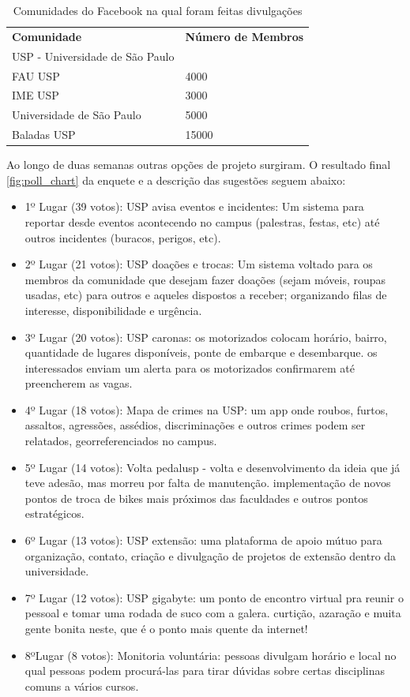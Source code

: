 \begin{table}[]
\centering
\caption{Comunidades do Facebook na qual foram feitas divulgações}
\label{my-label}
\begin{tabular}{ll}
{\color[HTML]{3531FF} \textbf{Comunidade}} & {\color[HTML]{3531FF} \textbf{Número de Membros}} \\
USP - Universidade de São Paulo            &                                                   \\
FAU USP                                    & 4000                                              \\
IME USP                                    & 3000                                              \\
Universidade de São Paulo                  & 5000                                              \\
Baladas USP                                & 15000
\end{tabular}
\end{table}
\par Ao longo de duas semanas outras opções de projeto surgiram. O resultado final \ref{fig:poll_chart} da enquete e a descrição das sugestões seguem abaixo:
\begin{itemize}
\item{ 1º Lugar (39 votos):} USP avisa eventos e incidentes: Um sistema para reportar desde eventos acontecendo no campus (palestras, festas, etc) até outros incidentes (buracos, perigos, etc).
\item {2º Lugar (21 votos):} USP doações e trocas: Um sistema voltado para os membros da comunidade que desejam fazer doações (sejam móveis, roupas usadas, etc) para outros e aqueles dispostos a receber; organizando filas de interesse, disponibilidade e urgência.
\item {3º Lugar (20 votos):} USP caronas: os motorizados colocam horário, bairro, quantidade de lugares disponíveis, ponte de embarque e desembarque. os interessados enviam um alerta para os motorizados confirmarem até preencherem as vagas.
\item {4º Lugar (18 votos):} Mapa de crimes na USP: um app onde roubos, furtos, assaltos, agressões, assédios, discriminações e outros crimes podem ser relatados, georreferenciados no campus.
\item {5º Lugar (14 votos):} Volta pedalusp - volta e desenvolvimento da ideia que já teve adesão, mas morreu por falta de manutenção. implementação de novos pontos de troca de bikes mais próximos das faculdades e outros pontos estratégicos.
\item {6º Lugar (13 votos): } USP extensão: uma plataforma de apoio mútuo para organização, contato, criação e divulgação de projetos de extensão dentro da universidade.
\item {7º Lugar (12 votos):} USP gigabyte: um ponto de encontro virtual pra reunir o pessoal e tomar uma rodada de suco com a galera. curtição, azaração e muita gente bonita neste, que é o ponto mais quente da internet!
\item {8ºLugar (8 votos):} Monitoria voluntária: pessoas divulgam horário e local no qual pessoas podem procurá-las para tirar dúvidas sobre certas disciplinas comuns a vários cursos.
\end{itemize}
